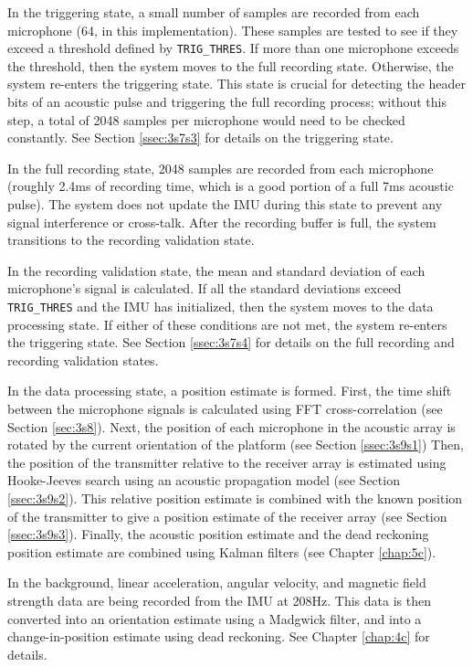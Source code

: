 \documentclass[11pt]{ucthesisCP}
\begin{document}
In the triggering state, a small number of samples are recorded from each microphone (64, in this implementation). These samples are tested to see if they exceed a threshold defined by \verb|TRIG_THRES|. If more than one microphone exceeds the threshold, then the system moves to the full recording state. Otherwise, the system re-enters the triggering state. This state is crucial for detecting the header bits of an acoustic pulse and triggering the full recording process; without this step, a total of 2048 samples per microphone would need to be checked constantly. See Section \ref{ssec:3s7s3} for details on the triggering state.

In the full recording state, 2048 samples are recorded from each microphone (roughly 2.4ms of recording time, which is a good portion of a full 7ms acoustic pulse). The system does not update the IMU during this state to prevent any signal interference or cross-talk. After the recording buffer is full, the system transitions to the recording validation state.

In the recording validation state, the mean and standard deviation of each microphone’s signal is calculated. If all the standard deviations exceed \verb|TRIG_THRES| and the IMU has initialized, then the system moves to the data processing state. If either of these conditions are not met, the system re-enters the triggering state. See Section \ref{ssec:3s7s4} for details on the full recording and recording validation states.

In the data processing state, a position estimate is formed. First, the time shift between the microphone signals is calculated using FFT cross-correlation (see Section \ref{sec:3s8}). Next, the position of each microphone in the acoustic array is rotated by the current orientation of the platform (see Section \ref{ssec:3s9s1}) Then, the position of the transmitter relative to the receiver array is estimated using Hooke-Jeeves search using an acoustic propagation model (see Section \ref{ssec:3s9s2}). This relative position estimate is combined with the known position of the transmitter to give a position estimate of the receiver array (see Section \ref{ssec:3s9s3}). Finally, the acoustic position estimate and the dead reckoning position estimate are combined using Kalman filters (see Chapter \ref{chap:5c}).

In the background, linear acceleration, angular velocity, and magnetic field strength data are being recorded from the IMU at 208Hz. This data is then converted into an orientation estimate using a Madgwick filter, and into a change-in-position estimate using dead reckoning. See Chapter \ref{chap:4c} for details.
\end{document}
